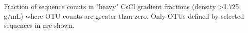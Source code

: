 Fraction of sequence counts in "heavy" CsCl gradient fractions (density \textgreater 1.725 g/mL) where OTU counts are greater than zero. Only OTUs defined by selected sequences in \citet{Yeager} are shown.